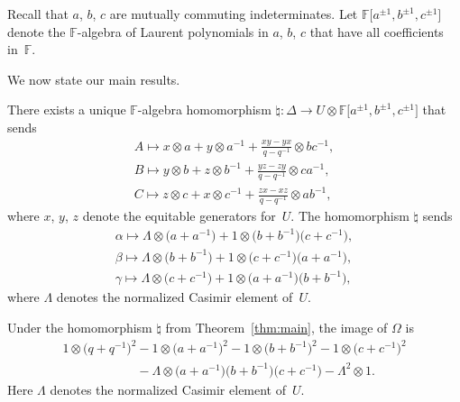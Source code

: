 Recall that $a$, $b$, $c$ are mutually commuting indeterminates.
Let
$\mathbb F \lbrack a^{\pm 1}, b^{\pm 1}, c^{\pm 1}\rbrack$
denote the $\mathbb F$-algebra
of Laurent polynomials in
$a$, $b$, $c$ that have all coef\/f\/icients in~$\mathbb F$.

We now state our main results.


\begin{Theorem}\label{thm:main}
There exists a unique  $\mathbb F$-algebra homomorphism
$\natural: \Delta \to
U \otimes
\mathbb F \lbrack a^{\pm 1}, b^{\pm 1}, c^{\pm 1}\rbrack
$ that sends
\begin{gather*}
A  \mapsto   x \otimes a + y \otimes a^{-1} +
\frac{x y - y x}{q-q^{-1}} \otimes b c^{-1},
\\
B \mapsto  y \otimes b + z \otimes b^{-1} +
\frac{y z - z y}{q-q^{-1}} \otimes c a^{-1},
\\
C \mapsto  z \otimes c + x \otimes c^{-1} +
\frac{z x - x z}{q-q^{-1}} \otimes a b^{-1},
\end{gather*}
where $x$, $y$, $z$ denote the equitable generators for~$U$.
The homomorphism $\natural$ sends
\begin{gather}
\alpha  \mapsto  \Lambda \otimes \big(a+a^{-1}\big) + 1\otimes \big(b+b^{-1}\big)\big(c+c^{-1}\big),
\label{eq:alsend}
\\
\beta  \mapsto  \Lambda \otimes \big(b+b^{-1}\big) + 1 \otimes \big(c+c^{-1}\big)\big(a+a^{-1}\big),
\label{eq:besend}
\\
\gamma  \mapsto  \Lambda \otimes \big(c+c^{-1}\big) + 1 \otimes \big(a+a^{-1}\big)\big(b+b^{-1}\big),
\label{eq:gasend}
\end{gather}
where $\Lambda $ denotes the normalized Casimir element of~$U$.
\end{Theorem}


\begin{Theorem}\label{thm:main2}
Under the homomorphism
$\natural$
from Theorem~{\rm \ref{thm:main}}, the image of
$\Omega$ is
\begin{gather}
1 \otimes \big(q+q^{-1}\big)^2
-
1\otimes \big(a+a^{-1}\big)^2
-
1\otimes \big(b+b^{-1}\big)^2
-
1 \otimes \big(c+c^{-1}\big)^2
\nonumber\\
\phantom{1 \otimes \big(q+q^{-1}\big)^2}{}
-\Lambda \otimes \big(a+a^{-1}\big)\big(b+b^{-1}\big)\big(c+c^{-1}\big)
- \Lambda ^2 \otimes 1.\label{eq:omimage}
\end{gather}
Here $\Lambda$ denotes the normalized Casimir element
of~$U$.
\end{Theorem}

